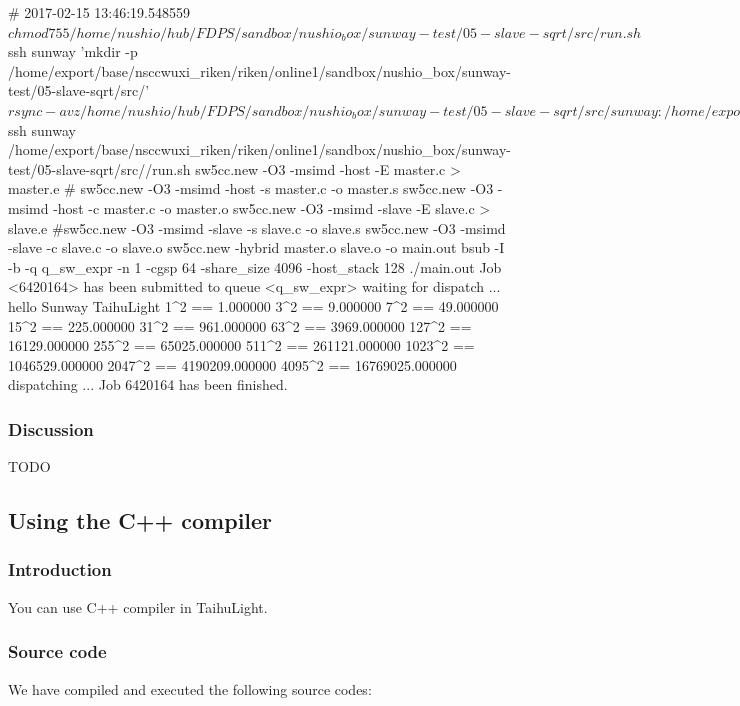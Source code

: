 \begin{code}
# 2017-02-15 13:46:19.548559
$ chmod 755 /home/nushio/hub/FDPS/sandbox/nushio_box/sunway-test/05-slave-sqrt/src/run.sh
$ ssh sunway 'mkdir -p /home/export/base/nsccwuxi_riken/riken/online1/sandbox/nushio_box/sunway-test/05-slave-sqrt/src/'
$ rsync -avz /home/nushio/hub/FDPS/sandbox/nushio_box/sunway-test/05-slave-sqrt/src/ sunway:/home/export/base/nsccwuxi_riken/riken/online1/sandbox/nushio_box/sunway-test/05-slave-sqrt/src/
sending incremental file list
run.sh

sent 173 bytes  received 40 bytes  28.40 bytes/sec
total size is 2,062  speedup is 9.68
$ ssh sunway /home/export/base/nsccwuxi_riken/riken/online1/sandbox/nushio_box/sunway-test/05-slave-sqrt/src//run.sh
sw5cc.new -O3 -msimd -host -E master.c > master.e
#	sw5cc.new -O3 -msimd -host -s master.c -o master.s
sw5cc.new -O3 -msimd -host -c master.c -o master.o
sw5cc.new -O3 -msimd -slave -E slave.c > slave.e
#sw5cc.new -O3 -msimd -slave -s slave.c -o slave.s
sw5cc.new -O3 -msimd -slave -c slave.c -o slave.o
sw5cc.new -hybrid  master.o slave.o -o main.out
bsub -I -b -q q_sw_expr -n 1 -cgsp 64 -share_size 4096 -host_stack 128 ./main.out
Job <6420164> has been submitted to queue <q_sw_expr>
waiting for dispatch ...
hello Sunway TaihuLight
1^2 == 1.000000
3^2 == 9.000000
7^2 == 49.000000
15^2 == 225.000000
31^2 == 961.000000
63^2 == 3969.000000
127^2 == 16129.000000
255^2 == 65025.000000
511^2 == 261121.000000
1023^2 == 1046529.000000
2047^2 == 4190209.000000
4095^2 == 16769025.000000
dispatching ...
Job 6420164 has been finished.

\end{code}

\subsubsection{Discussion}

TODO


\subsection{Using the C++ compiler}
\subsubsection{Introduction}

You can use C++ compiler in TaihuLight.



\subsubsection{Source code}
 We have compiled and executed the following source codes:

